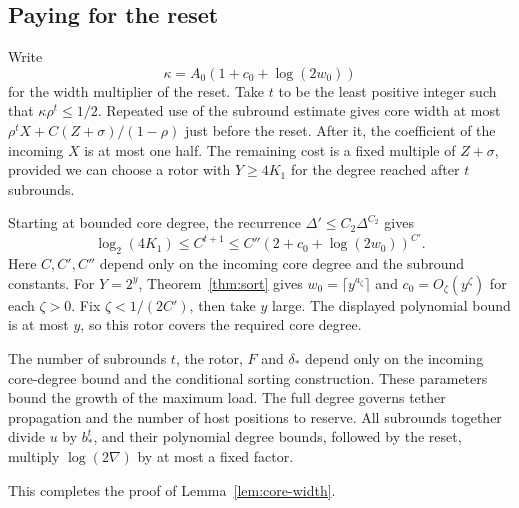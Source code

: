 \subsection{Paying for the reset}
Write
\[
 \kappa=A_0(1+c_0+\log(2w_0))
\]
for the width multiplier of the reset. Take \(t\) to be the least
positive integer such that \(\kappa\rho^t\le1/2\). Repeated use of the
subround estimate gives core width at most
\(\rho^tX+C(Z+\sigma)/(1-\rho)\) just before the reset. After it,
the coefficient of the incoming \(X\) is at most one half. The
remaining cost is a fixed multiple of \(Z+\sigma\), provided we can
choose a rotor with \(Y\ge4K_1\) for the degree reached after \(t\)
subrounds.

Starting at bounded core degree, the recurrence
\(\Delta'\le C_2\Delta^{C_2}\) gives
\[
 \log_2(4K_1)\le C^{t+1}
      \le C''(2+c_0+\log(2w_0))^{C'} .
\]
Here \(C,C',C''\) depend only on the incoming core degree and the
subround constants. For \(Y=2^y\), Theorem~\ref{thm:sort} gives
\(w_0=\lceil y^{a_\zeta}\rceil\) and \(c_0=O_\zeta(y^\zeta)\) for
each \(\zeta>0\). Fix \(\zeta<1/(2C')\), then take \(y\) large. The
displayed polynomial bound is at most \(y\), so this rotor covers the
required core degree.

The number of subrounds \(t\), the rotor, \(F\) and \(\delta_*\)
depend only on the incoming core-degree bound and the conditional
sorting construction. These parameters bound the growth of the maximum
load. The full degree governs tether propagation and the number of host
positions to reserve. All subrounds together divide \(u\) by
\(b_*^t\), and their polynomial degree bounds, followed by the reset,
multiply \(\log(2\nabla)\) by at most a fixed factor.

This completes the proof of Lemma~\ref{lem:core-width}.
